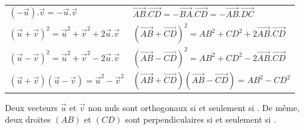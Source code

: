 \documentclass{beamer}
\theoremstyle{plain}
\begin{document}
 \begin{frame}
 
  \begin{example}

  \vspace{0.5cm}~
  
  \begin{tabular}{ll}

 $(-\vec{u}).\vec{v}=-\vec{u}.\vec{v}$
 &
 \scriptsize $\vec{AB}.\vec{CD}=-\vec{BA}.\vec{CD}=-\vec{AB}.\vec{DC}$\\
 
 $(\vec{u}+\vec{v})^2=\vec{u}^2+\vec{v}^2+2\vec{u}.\vec{v}$
 &
 \scriptsize $(\vec{AB}+\vec{CD})^2=AB^2+CD^2+2\vec{AB}.\vec{CD}$ \\
  
 $(\vec{u}-\vec{v})^2=\vec{u}^2+\vec{v}^2-2\vec{u}.\vec{v}$
 &
 \scriptsize $(\vec{AB}-\vec{CD})^2=AB^2+CD^2-2\vec{AB}.\vec{CD}$\\
 
 $(\vec{u}+\vec{v})(\vec{u}-\vec{v})=\vec{u}^2-\vec{v}^2$
&
 \scriptsize $(\vec{AB}+\vec{CD})(\vec{AB}-\vec{CD})=AB^2-CD^2$
 
  \end{tabular}

  \end{example}
  
  \end{frame}
 

 \begin{frame}
\begin{theorem}

 Deux vecteurs $\vec{u}$ et $\vec{v}$ non nuls sont orthogonaux si et seulement si . 
 De même, deux droites $(AB)$ et $(CD)$ sont perpendiculaires si et seulement si 
 .
\end{theorem}
\end{frame}
\end{document}
